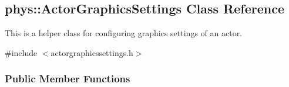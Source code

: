 \hypertarget{classphys_1_1ActorGraphicsSettings}{
\subsection{phys::ActorGraphicsSettings Class Reference}
\label{dd/dd6/classphys_1_1ActorGraphicsSettings}
}


This is a helper class for configuring graphics settings of an actor.  




{\ttfamily \#include $<$actorgraphicssettings.h$>$}

\subsubsection*{Public Member Functions}
